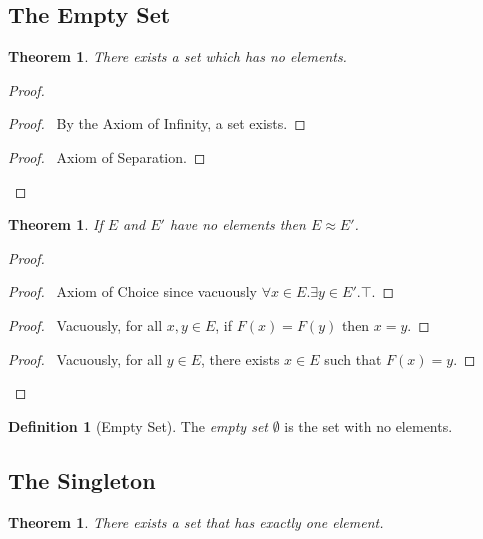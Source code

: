 \documentclass{book}
\let\qed\relax
\newtheorem{thm}[ax]{Theorem}
\theoremstyle{definition}
\newtheorem{df}[ax]{Definition}
\begin{document}
\subsection{The Empty Set}

\begin{thm}
There exists a set which has no elements.
\end{thm}

\begin{proof}
\pf
{}
\begin{proof}
	\pf\ By the Axiom of Infinity, a set exists.
\end{proof}
\begin{proof}
	\pf\ Axiom of Separation.
\end{proof}
\qed
\end{proof}

\begin{thm}
If $E$ and $E'$ have no elements then $E \approx E'$.
\end{thm}

\begin{proof}
\pf
{}
\begin{proof}
	\pf\ Axiom of Choice since vacuously $\forall x \in E. \exists y \in E'. \top$.
\end{proof}
\begin{proof}
	\pf\ Vacuously, for all $x,y \in E$, if $F(x) = F(y)$ then $x = y$.
\end{proof}
\begin{proof}
	\pf\ Vacuously, for all $y \in E$, there exists $x \in E$ such that $F(x) = y$.
\end{proof}
\qed
\end{proof}

\begin{df}[Empty Set]
The \emph{empty set} $\emptyset$ is the set with no elements.
\end{df}

\subsection{The Singleton}

\begin{thm}
There exists a set that has exactly one element.
\end{thm}
\end{document}
